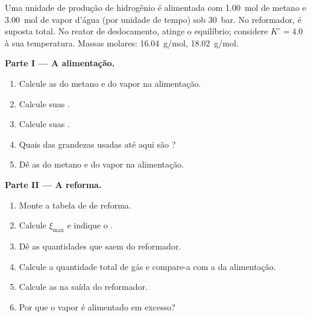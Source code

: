\begin{problem}
\label{pb:b1:extent-q-and-k:1}
Uma unidade de produção de hidrogênio é alimentada com \qty{1.00}{mol} de
metano e \qty{3.00}{mol} de vapor d'água (por unidade de tempo) sob
\qty{30}{bar}. No reformador,  é suposta
total. No reator de deslocamento,  atinge o
equilíbrio; considere $K^\circ =
4.0$ à sua temperatura. Massas molares:  \qty{16.04}{g/mol},
 \qty{18.02}{g/mol}.

\medskip
\noindent\textbf{Parte I --- A alimentação.}
\begin{enumerate}
  \item Calcule as  do metano e do vapor na alimentação.
  \item Calcule suas .
  \item Calcule suas .
  \item Quais das grandezas usadas até aqui são ?
  \item Dê as  do metano e do vapor na alimentação.
\end{enumerate}

\medskip
\noindent\textbf{Parte II --- A reforma.}
\begin{enumerate}[resume]
  \item Monte a tabela de  de reforma.
  \item Calcule $\xi_{\max}$ e indique o .
  \item Dê as quantidades que saem do reformador.
  \item Calcule a quantidade total de gás e compare-a com a da alimentação.
  \item Calcule as  na saída do reformador.
  \item Por que o vapor é alimentado em excesso?
\end{enumerate}


\end{problem}
